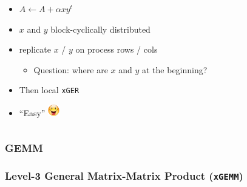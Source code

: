 \documentclass[xcolor={rgb,x11names,svgnames},rgb,x11names,svgnames]{beamer}
\newcommand{\smiley}{\includegraphics[width=0.5cm,trim=0 17mm 0 0]{content}}
\newcommand{\tikzmat}[2] {
\draw[thick] let \p1 = (#1 |- #2),
                 \p2 = (#2 |- #1) in
   ($ (#1) + (0.05,-0.1) $) -- ++(-0.15, 0)  -- ($ (\p1) + (-0.1,0.1) $) -- ++(0.15,0)
   ($ (\p2) + (-0.05,-0.1) $) -- ++(0.15, 0) -- ($ (#2) + (0.1,0.1) $) -- ++(-0.15,0);
}
\begin{document}
\begin{frame}[label=block-cyclic, fragile]
\begin{columns}
\begin{column}{5cm}
  \begin{itemize}
  \item $A \gets A + \alpha x y^t$
  \item $x$ and $y$ block-cyclically distributed

    \medskip
    
  \item \alert{replicate} $x$ / $y$ on process rows / cols
    \begin{itemize}
    \item Question: where are $x$ and $y$ at the beginning?
    \end{itemize}
  \item Then local \texttt{xGER}
  \item ``Easy'' \smiley
  \end{itemize}
\end{column}
\end{columns}

\end{frame}


\subsubsection{GEMM}

\begin{frame}[label=gemm]
  \frametitle{Level-3 General Matrix-Matrix Product (\texttt{xGEMM})}

  \begin{center}
  \end{center}
\end{frame}
\end{document}

